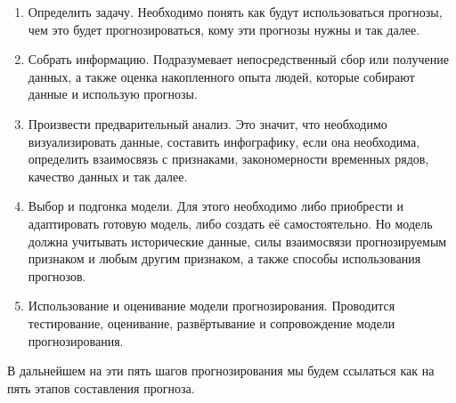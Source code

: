{  \begin{enumerate} %
    \item Определить задачу. Необходимо понять как будут использоваться прогнозы, чем это будет прогнозироваться, кому эти прогнозы нужны и так далее. 
    \item Собрать информацию. Подразумевает непосредственный сбор или получение данных, а также оценка накопленного опыта людей, которые собирают данные и использую прогнозы.
    \item Произвести предварительный анализ. Это значит, что необходимо визуализировать данные, составить инфографику, если она необходима, определить взаимосвязь с признаками, закономерности временных рядов, качество данных и так далее.
    \item Выбор и подгонка модели. Для этого необходимо либо приобрести и адаптировать готовую модель, либо создать её самостоятельно. Но модель должна учитывать исторические данные, силы взаимосвязи прогнозируемым признаком и любым другим признаком, а также способы использования прогнозов.
    \item Использование и оценивание модели прогнозирования. Проводится тестирование, оценивание, развёртывание и сопровождение модели прогнозирования. 
  \end{enumerate} %

  \par В дальнейшем на эти пять шагов прогнозирования мы будем ссылаться как на пять этапов составления прогноза.

  \par %
}


